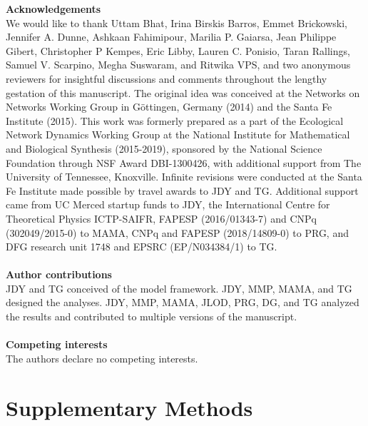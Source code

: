 \documentclass[twocolumn,preprintnumbers,amsmath,amssymb,superscriptaddress,linenumbers]{revtex4-1}
\newcommand{\beginsupplement}{%
        \clearpage
        \setcounter{table}{0}
        \renewcommand{\thetable}{S\arabic{table}}%
        \setcounter{figure}{0}
        \renewcommand{\thefigure}{S\arabic{figure}}%
        \setcounter{equation}{0}
        \renewcommand{\theequation}{S\arabic{equation}}
     }
\begin{document}
\vspace{2mm}
\noindent \textbf{Acknowledgements}\\
  \footnotesize{
  We would like to thank
  Uttam Bhat,
  Irina Birskis Barros,
  Emmet Brickowski,
  Jennifer A. Dunne,
  Ashkaan Fahimipour,
  Marilia P. Gaiarsa,
  Jean Philippe Gibert,
  Christopher P Kempes,
  Eric Libby,
  Lauren C. Ponisio,
  Taran Rallings,
  Samuel V. Scarpino,
  Megha Suswaram,
  and Ritwika VPS,
  and two anonymous reviewers
  for insightful discussions and comments throughout the lengthy gestation of this manuscript.
  The original idea was conceived at the Networks on Networks Working Group in G\"ottingen, Germany (2014) and the Santa Fe Institute (2015).
  This work was formerly prepared as a part of the Ecological Network Dynamics Working Group at the National Institute for Mathematical and Biological Synthesis (2015-2019), sponsored by the National Science Foundation through NSF Award DBI-1300426, with additional support from The University of Tennessee, Knoxville.
  Infinite revisions were conducted at the Santa Fe Institute made possible by travel awards to JDY and TG.
  Additional support came from UC Merced startup funds to JDY, the International Centre for Theoretical Physics ICTP-SAIFR, FAPESP (2016/01343-7) and CNPq (302049/2015-0) to MAMA, CNPq and FAPESP (2018/14809-0) to PRG, and DFG research unit 1748 and EPSRC (EP/N034384/1) to TG.
  }\\ \\
  
\noindent \textbf{Author contributions}\\
  \footnotesize{
  JDY and TG conceived of the model framework. JDY, MMP, MAMA, and TG designed the analyses. JDY, MMP, MAMA, JLOD, PRG, DG, and TG analyzed the results and contributed to multiple versions of the manuscript.
  }\\ \\
\noindent \textbf{Competing interests}\\
  \footnotesize{
  The authors declare no competing interests.
  }
\clearpage

\clearpage


\beginsupplement


\section*{Supplementary Methods}
\end{document}
